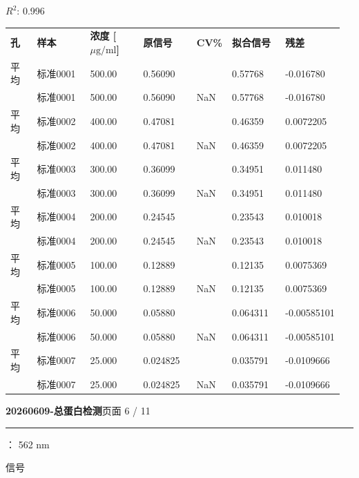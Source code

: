 \documentclass[UTF8,10pt,a4paper,fontset=fandol]{ctexart}
\newcommand{\fieldvalue}[1]{#1}
\begin{document}
\noindent
$R^2$: 0.996

\medskip

\small
\begin{tabular}{p{0.08\linewidth}p{0.16\linewidth}p{0.16\linewidth}p{0.16\linewidth}p{0.10\linewidth}p{0.16\linewidth}p{0.14\linewidth}}
\textbf{孔} & \textbf{样本} & \textbf{浓度 [$\mu\mathrm{g}/\mathrm{ml}$]} & \textbf{原信号} & \textbf{CV\%} & \textbf{拟合信号} & \textbf{残差} \\
平均 & 标准0001 & 500.00 & 0.56090 &  & 0.57768 & -0.016780 \\
 & 标准0001 & 500.00 & 0.56090 & NaN & 0.57768 & -0.016780 \\
平均 & 标准0002 & 400.00 & 0.47081 &  & 0.46359 & 0.0072205 \\
 & 标准0002 & 400.00 & 0.47081 & NaN & 0.46359 & 0.0072205 \\
平均 & 标准0003 & 300.00 & 0.36099 &  & 0.34951 & 0.011480 \\
 & 标准0003 & 300.00 & 0.36099 & NaN & 0.34951 & 0.011480 \\
平均 & 标准0004 & 200.00 & 0.24545 &  & 0.23543 & 0.010018 \\
 & 标准0004 & 200.00 & 0.24545 & NaN & 0.23543 & 0.010018 \\
平均 & 标准0005 & 100.00 & 0.12889 &  & 0.12135 & 0.0075369 \\
 & 标准0005 & 100.00 & 0.12889 & NaN & 0.12135 & 0.0075369 \\
平均 & 标准0006 & 50.000 & 0.05880 &  & 0.064311 & -0.00585101 \\
 & 标准0006 & 50.000 & 0.05880 & NaN & 0.064311 & -0.00585101 \\
平均 & 标准0007 & 25.000 & 0.024825 &  & 0.035791 & -0.0109666 \\
 & 标准0007 & 25.000 & 0.024825 & NaN & 0.035791 & -0.0109666 \\
\end{tabular}
\normalsize

\newpage

\noindent\textbf{20260609-总蛋白检测}\hfill 页面 6 / 11

\noindent\rule{\linewidth}{0.4pt}

：
\fieldvalue{562 nm}

\qquad 信号
\end{document}
